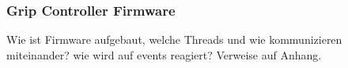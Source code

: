 \documentclass[main.tex]{subfiles} %
\begin{document}

\subsubsection{Grip Controller Firmware}

Wie ist Firmware aufgebaut, welche Threads und wie kommunizieren miteinander?
wie wird auf events reagiert? Verweise auf Anhang.
\end{document}
